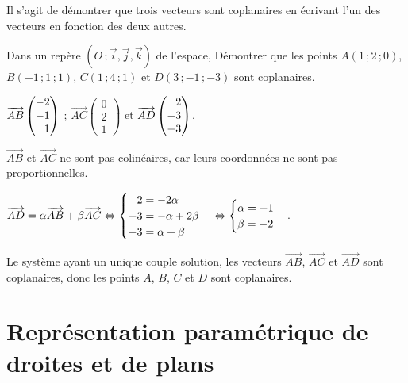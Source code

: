 \begin{methode*1}

  Il s'agit de démontrer que trois vecteurs sont coplanaires en
  écrivant l'un des vecteurs en fonction des deux autres.

  \exercice 

  Dans un repère $(O\,;\vec{i},\vec{j},\vec{k})$ de l'espace, Démontrer
  que les points $A(1\,;2\,;0)$, $B(-1\,;1\,;1)$, $C(1\,;4\,;1)$ et $D(3\,;-1\,;-3)$
  sont coplanaires.

  \correction

  $\overrightarrow{AB} 
  \begin{pmatrix} 
    -2\\
    -1\\
    \hphantom{-}1
  \end{pmatrix}$ ; $\overrightarrow{AC} \begin{pmatrix} 0\\2\\1
  \end{pmatrix}$ et $\overrightarrow{AD} \begin{pmatrix} \hphantom{-}2\\-3\\-3
  \end{pmatrix}$.

  $\overrightarrow{AB}$ et $\overrightarrow{AC}$ ne sont pas
  colinéaires, car leurs coordonnées ne sont pas proportionnelles.

  $\overrightarrow{AD}=\alpha\overrightarrow{AB}+\beta\overrightarrow{AC}\Leftrightarrow%
  \begin{cases}
    \hphantom{-}2=-2\alpha\\
    -3=-\alpha+2\beta\\
    -3=\alpha+\beta
  \end{cases}\Leftrightarrow
  \begin{cases}
    \alpha=-1\\
    \beta=-2
  \end{cases}$.

  Le système ayant un unique couple solution, les vecteurs
  $\overrightarrow{AB}$, $\overrightarrow{AC}$ et
  $\overrightarrow{AD}$ sont coplanaires, donc les points $A$, $B$,
  $C$ et $D$ sont coplanaires.
\end{methode*1}

\section{Représentation paramétrique de droites et de plans}

